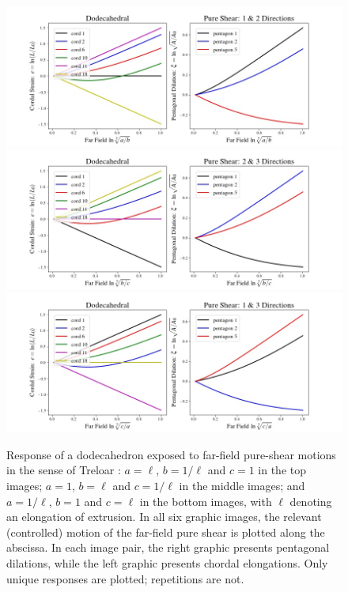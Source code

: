 \begin{figure}
	\centering
	\includegraphics[width=14cm]{figures/squeeze12.jpg} \\
	\includegraphics[width=14cm]{figures/squeeze23.jpg} \\
	\includegraphics[width=14cm]{figures/squeeze13.jpg} 
	\caption{Response of a dodecahedron exposed to far-field pure-shear motions in the sense of Treloar \cite{Treloar75}: $a = \ell$, $b = 1/\ell$ and $c = 1$ in the top images; $a = 1$, $b = \ell$ and $c = 1/\ell$ in the middle images; and $a = 1/\ell$, $b = 1$ and $c = \ell$ in the bottom images, with $\ell$ denoting an elongation of extrusion.  In all six graphic images, the relevant (controlled) motion of the far-field pure shear is plotted along the abscissa.  In each image pair, the right graphic presents pentagonal dilations, while the left graphic presents chordal elongations. Only unique responses are plotted; repetitions are not.}
	\label{figPureShears}
\end{figure}

